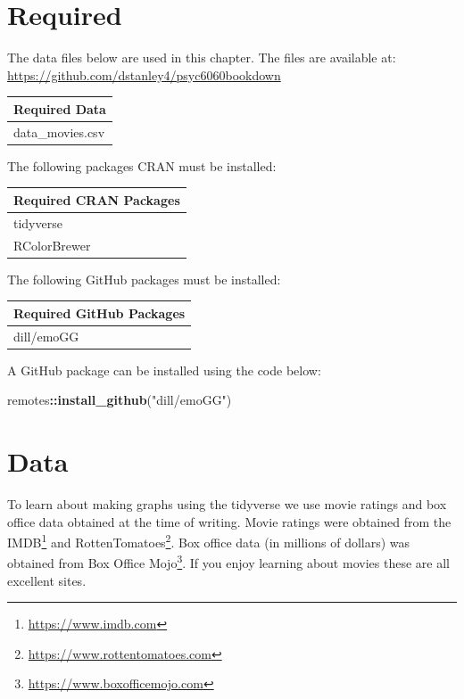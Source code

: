 \documentclass[
]{krantz}
\makeatletter
\newenvironment{Shaded}{\begin{snugshade}}{\end{snugshade}}
\newcommand{\KeywordTok}[1]{\textcolor[rgb]{0.27,0.27,0.27}{\textbf{#1}}}
\newcommand{\NormalTok}[1]{#1}
\newcommand{\OperatorTok}[1]{\textcolor[rgb]{0.43,0.43,0.43}{\textbf{#1}}}
\newcommand{\StringTok}[1]{\textcolor[rgb]{0.5,0.5,0.5}{#1}}
\renewcommand{\href}[2]{#2\footnote{\url{#1}}}
\newenvironment{kframe}{%
\medskip{}
\setlength{\fboxsep}{.8em}
 \def\at@end@of@kframe{}%
 \ifinner\ifhmode%
  \def\at@end@of@kframe{\end{minipage}}%
  \begin{minipage}{\columnwidth}%
 \fi\fi%
 \def\FrameCommand##1{\hskip\@totalleftmargin \hskip-\fboxsep
 \colorbox{shadecolor}{##1}\hskip-\fboxsep
     \hskip-\linewidth \hskip-\@totalleftmargin \hskip\columnwidth}%
 \MakeFramed {\advance\hsize-\width
   \@totalleftmargin\z@ \linewidth\hsize
   \@setminipage}}%
 {\par\unskip\endMakeFramed%
 \at@end@of@kframe}
\renewenvironment{Shaded}{\begin{kframe}}{\end{kframe}}
\makeatother
\begin{document}
\hypertarget{required}{%
\section{Required}\label{required}}

The data files below are used in this chapter. The files are available at: \url{https://github.com/dstanley4/psyc6060bookdown}

\begin{longtable}[]{@{}l@{}}
\toprule
Required Data\tabularnewline
\midrule
\endhead
data\_movies.csv\tabularnewline
\bottomrule
\end{longtable}

The following packages CRAN must be installed:

\begin{longtable}[]{@{}l@{}}
\toprule
Required CRAN Packages\tabularnewline
\midrule
\endhead
tidyverse\tabularnewline
RColorBrewer\tabularnewline
\bottomrule
\end{longtable}

The following GitHub packages must be installed:

\begin{longtable}[]{@{}l@{}}
\toprule
Required GitHub Packages\tabularnewline
\midrule
\endhead
dill/emoGG\tabularnewline
\bottomrule
\end{longtable}

A GitHub package can be installed using the code below:

\begin{Shaded}
\begin{Highlighting}[]
\NormalTok{remotes}\OperatorTok{::}\KeywordTok{install_github}\NormalTok{(}\StringTok{"dill/emoGG"}\NormalTok{)}
\end{Highlighting}
\end{Shaded}

\hypertarget{data}{%
\section{Data}\label{data}}

To learn about making graphs using the tidyverse we use movie ratings and box office data obtained at the time of writing. Movie ratings were obtained from the \href{https://www.imdb.com}{IMDB} and \href{https://www.rottentomatoes.com}{RottenTomatoes}. Box office data (in millions of dollars) was obtained from \href{https://www.boxofficemojo.com}{Box Office Mojo}. If you enjoy learning about movies these are all excellent sites.
\end{document}
